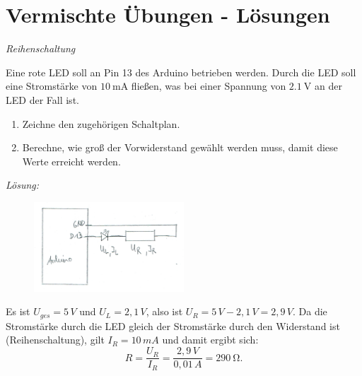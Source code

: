 \documentclass[ngerman, 11pt]{scrreprt}
\begin{document}
	\setcounter{chapter}{3}
	\setcounter{section}{8}
	\setcounter{aufgabennummer}{12}
	\onehalfspacing
	
	\section{Vermischte Übungen - Lösungen}
	
	\begin{aufgabe} \emph{Reihenschaltung}
		
		Eine rote LED soll an Pin 13 des Arduino betrieben werden. Durch die LED soll eine Stromstärke von $\SI{10}{\milli\ampere}$ fließen, was bei einer Spannung von $\SI{2,1}{\volt}$ an der LED der Fall ist. 
		\begin{enumerate}[label=\alph*), itemsep=0ex]
			\item Zeichne den zugehörigen Schaltplan.
			\item Berechne, wie groß der Vorwiderstand gewählt werden muss, damit diese Werte erreicht werden.
		\end{enumerate}
	\end{aufgabe}
	
	\bigskip
	\emph{Lösung:}
	
	\begin{figure}[H]
		\centering
		\includegraphics[width=0.5\textwidth]{../pics/uebung-reihe-schaltplan.png}
	\end{figure}
	
	Es ist $U_{ges}=5\,V$ und  $U_{L}=2,1\,V$, also ist $U_R=5\,V-2,1\,V=2,9\,V$. Da die Stromstärke durch die LED gleich der Stromstärke durch den Widerstand ist (Reihenschaltung), gilt $I_R=10\,mA$ und damit ergibt sich:
	\begin{equation*}
		R=\frac{U_R}{I_R}=\frac{2,9\,V}{0,01\,A}=\SI{290}{\ohm}.
	\end{equation*}
	
\end{document}
